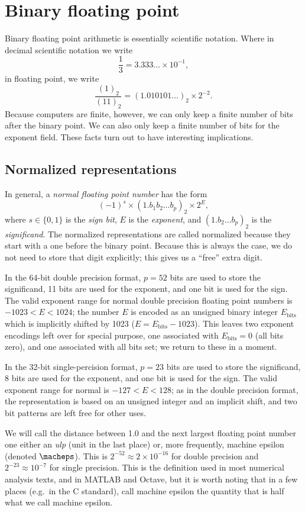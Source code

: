 \section{Binary floating point}

Binary floating point arithmetic is essentially scientific notation.
Where in decimal scientific notation we write
\[
  \frac{1}{3}
  = 3.333\ldots \times 10^{-1},
\]
in floating point, we write
\[
  \frac{(1)_2}{(11)_2}
  = (1.010101\ldots)_2 \times 2^{-2}.
\]
Because computers are finite, however, we can only keep a finite
number of bits after the binary point.  We can also only keep a finite
number of bits for the exponent field.  These facts turn out to have
interesting implications.

\subsection{Normalized representations}

In general, a {\em normal floating point number} has the form
\[
  (-1)^s \times (1.b_1 b_2 \ldots b_p)_2 \times 2^{E},
\]
where $s \in \{0,1\}$ is the {\em sign bit},
$E$ is the {\em exponent}, and
$(1.b_2 \ldots b_p)_2$ is the {\em significand}.
The normalized representations are called normalized because they
start with a one before the binary point.  Because this is always
the case, we do not need to store that digit explicitly; this gives
us a ``free'' extra digit.

In the 64-bit double precision format, $p = 52$ bits are used to store
the significand, 11 bits are used for the exponent, and one bit is
used for the sign.  The valid exponent range for normal double
precision floating point numbers is $-1023 < E < 1024$; the number
$E$ is encoded as an unsigned binary integer $E_{\mathrm{bits}}$
which is implicitly shifted by 1023 ($E = E_{\mathrm{bits}}-1023$).
This leaves two exponent encodings left over for special purpose,
one associated with $E_{\mathrm{bits}} = 0$ (all bits zero),
and one associated with all bits set; we return to these in a moment.

In the 32-bit single-percision format, $p = 23$ bits are used to store
the significand, 8 bits are used for the exponent, and one bit is used
for the sign.  The valid exponent range for normal is $-127 < E < 128$;
as in the double precision format, the representation is based on an
unsigned integer and an implicit shift, and two bit patterns are left
free for other uses.

We will call the distance between 1.0 and the next largest floating
point number one either an {\em ulp} (unit in the last place) or,
more frequently, machine epsilon (denoted $\macheps$).  This is
$2^{-52} \approx 2 \times 10^{-16}$ for double precision and
$2^{-23} \approx 10^{-7}$ for single precision.  This is the definition
used in most numerical analysis texts, and in MATLAB and Octave, but
it is worth noting that in a few places (e.g.~in the C standard),
call machine epsilon the quantity that is half what we
call machine epsilon.

